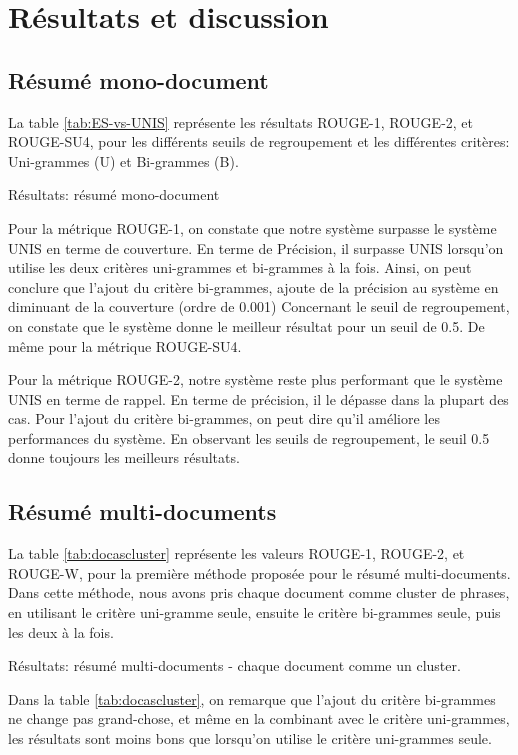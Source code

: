 \documentclass[a4paper,12pt,oneside]{../use/ESIthesis}
\begin{document}
\section{Résultats et discussion}

\subsection{Résumé mono-document}

La table \ref{tab:ES-vs-UNIS} représente les résultats ROUGE-1, ROUGE-2, et ROUGE-SU4, pour les différents seuils de regroupement et les différentes critères: Uni-grammes (U) et Bi-grammes (B).
%
\begin{table}[!htbp]
\centering
\caption{Résultats: résumé mono-document}
\label{tab:ES-vs-UNIS}
\end{table}
%
Pour la métrique ROUGE-1, on constate que notre système surpasse le système UNIS en terme de couverture. 
En terme de Précision, il surpasse UNIS lorsqu'on utilise les deux critères uni-grammes et bi-grammes à la fois.
Ainsi, on peut conclure que l'ajout du critère bi-grammes, ajoute de la précision au système en diminuant de la couverture (ordre de 0.001)
Concernant le seuil de regroupement, on constate que le système donne le meilleur résultat pour un seuil de 0.5. 
De même pour la métrique ROUGE-SU4.

Pour la métrique ROUGE-2, notre système reste plus performant que le système UNIS en terme de rappel. 
En terme de précision, il le dépasse dans la plupart des cas. 
Pour l'ajout du critère bi-grammes, on peut dire qu'il améliore les performances du système. 
En observant les seuils de regroupement, le seuil 0.5 donne toujours les meilleurs résultats.

\subsection{Résumé multi-documents}

La table \ref{tab:docascluster} représente les valeurs ROUGE-1, ROUGE-2, et ROUGE-W, pour la première méthode proposée pour le résumé multi-documents. 
Dans cette méthode, nous avons pris chaque document comme cluster de phrases, en utilisant le critère uni-gramme seule, ensuite le critère bi-grammes seule, puis les deux à la fois.
%
\begin{table}[!htbp]
\centering
\caption{Résultats: résumé multi-documents - chaque document comme un cluster.}
\label{tab:docascluster}
\end{table}
%
Dans la table \ref{tab:docascluster}, on remarque que l'ajout du critère bi-grammes ne change pas grand-chose, et même en la combinant avec le critère uni-grammes, les résultats sont moins bons que lorsqu'on utilise le critère uni-grammes seule.
\end{document}
